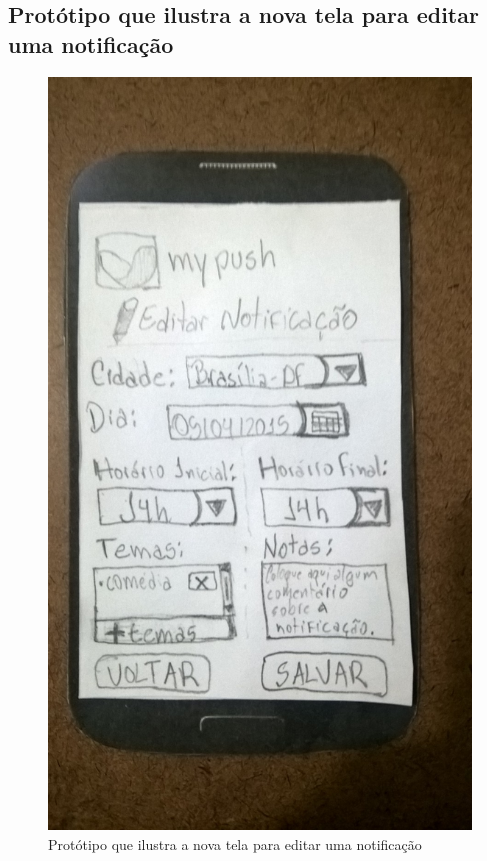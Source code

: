 \begin{anexosenv}
  \pagebreak
  \section*{Protótipo que ilustra a nova tela para editar uma notificação}

    \begin{figure}[!htbp]
      \centering
      \includegraphics[scale=0.32, angle=-90]{editaveis/figuras/prototipo_papel_v2/editar_notificacao}
      \caption{Protótipo que ilustra a nova tela para editar uma notificação}
      \label{editar_notificacao_v2}
    \end{figure}
  

\end{anexosenv}
